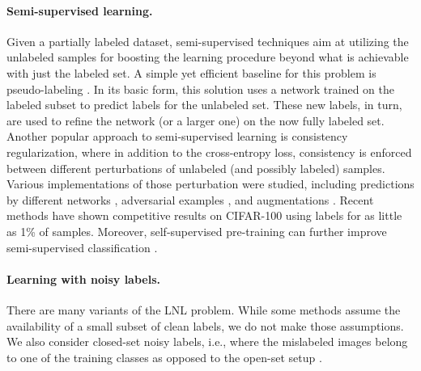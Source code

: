 \documentclass[10pt,twocolumn,letterpaper]{article}
\renewcommand{\cite}[1]{\citep{#1}}
\begin{document}
\paragraph{Semi-supervised learning.}
Given a partially labeled dataset, semi-supervised techniques aim at utilizing the unlabeled samples for boosting the learning procedure beyond what is achievable with just the labeled set. A simple yet efficient baseline for this problem 
is pseudo-labeling \cite{lee2013pseudo,arazo2019pseudolabeling,xie2019self,yalniz2019billion}. In its basic form, this solution uses a network trained on the labeled subset to predict labels for the unlabeled set. These new labels, in turn, are used to refine the network (or a larger one) on the now fully labeled set. Another popular approach to semi-supervised learning is consistency regularization, where in addition to the cross-entropy loss, consistency is enforced between different perturbations of unlabeled (and possibly labeled) samples. Various implementations of those perturbation were studied, including predictions by different networks \cite{tarvainen2017meanteacher}, adversarial examples \cite{miyato2017virtual}, and augmentations \cite{xie2019unsupervised,berthelot2019mixmatch,sohn2020fixmatch,french2020milking}. Recent methods have shown competitive results on CIFAR-100 using labels for as little as 1\% of samples. Moreover, self-supervised pre-training can further improve semi-supervised classification \cite{chen2020simclr2}.

\paragraph{Learning with noisy labels.}
There are many variants of the LNL problem. While some methods \cite{veit2017learning,litany2018soseleto,zhang2020severe} assume the availability of a small subset of clean labels, we do not make those assumptions. We also consider closed-set noisy labels, i.e., where the mislabeled images belong to one of the training classes as opposed to the open-set setup \cite{wang2018openset,zhang2018generalized}.
\end{document}
